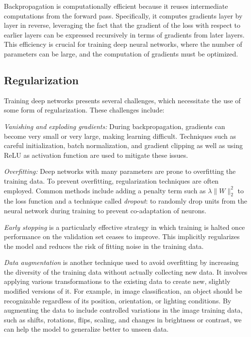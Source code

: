 Backpropagation is computationally efficient because it reuses intermediate computations from the forward pass. Specifically, it computes gradients layer by layer in reverse, leveraging the fact that the gradient of the loss with respect to earlier layers can be expressed recursively in terms of gradients from later layers. This efficiency is crucial for training deep neural networks, where the number of parameters can be large, and the computation of gradients must be optimized.



\subsection{Regularization}


Training deep networks presents several challenges, which necessitate the use of some form of regularization. These challenges include:


\noindent
{\em Vanishing and exploding gradients:} During backpropagation, gradients can become very small or very large, making learning difficult. Techniques such as careful initialization, batch normalization, and gradient clipping as well as using ReLU as activation function are used to mitigate these issues.

\noindent
{\em Overfitting:} Deep networks with many parameters are prone to overfitting the training data. To prevent overfitting, regularization techniques are often employed. Common methods include   adding a penalty term such as $ \lambda \|W\|_2^2 $ to the loss function and a technique called \emph{dropout}: to randomly drop units from the neural network during training to prevent co-adaptation of neurons. 

\noindent
{\em Early stopping} is a particularly effective strategy in which training is halted once performance on the validation set ceases to improve. This implicitly regularizes the model and reduces the risk of fitting noise in the training data.

\noindent
{\em Data augmentation} is another technique used to avoid overfitting by increasing the diversity of the training data  without actually collecting new data. It involves applying various transformations to the existing data to create new, slightly modified versions of it. For example, in image classification, an object should be recognizable regardless of its position, orientation, or lighting conditions. By augmenting the data to include controlled variations in the image training data, such as shifts, rotations, flips, scaling, and changes in brightness or contrast,  we can help the model to generalize better to unseen data.

